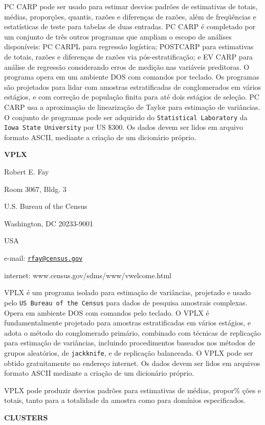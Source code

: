 \documentclass[]{book}
\theoremstyle{definition}
\theoremstyle{definition}
\theoremstyle{definition}
\theoremstyle{remark}
\begin{document}
PC CARP pode ser usado para estimar desvios padrões de estimativas de
totais, médias, proporções, quantis, razões e diferenças de razões, além
de freqüências e estatísticas de teste para tabelas de duas entradas. PC
CARP é completado por um conjunto de três outros programas que ampliam o
escopo de análises disponíveis: PC CARPL para regressão logística;
POSTCARP para estimativas de totais, razões e diferenças de razões via
pós-estratificação; e EV CARP para análise de regressão considerando
erros de medição nas variáveis preditoras. O programa opera em um
ambiente DOS com comandos por teclado. Os programas são projetados para
lidar com amostras estratificadas de conglomerados em vários estágios, e
com correção de população finita para até dois estágios de seleção. PC
CARP usa a aproximação de linearização de Taylor para estimação de
variâncias. O conjunto de programas pode ser adquirido do
\texttt{Statistical\ Laboratory} da \texttt{Iowa\ State\ University} por
US \(\$300\). Os dados devem ser lidos em arquivo formato ASCII,
mediante a criação de um dicionário próprio.

\textbf{VPLX}

Robert E. Fay

Room 3067, Bldg. 3

U.S. Bureau of the Census

Washington, DC 20233-9001

USA

e-mail: \href{mailto:rfay@census.gov}{\nolinkurl{rfay@census.gov}}

internet: www.census.gov/sdms/www/vwelcome.html

VPLX é um programa isolado para estimação de variâncias, projetado e
usado pelo \texttt{US\ Bureau\ of\ the\ Census} para dados de pesquisa
amostrais complexas. Opera em ambiente DOS com comandos pelo teclado. O
VPLX é fundamentalmente projetado para amostras estratificadas em vários
estágios, e adota o método do conglomerado primário, combinado com
técnicas de replicação para estimação de variâncias, incluindo
procedimentos baseados nos métodos de grupos aleatórios, de
\texttt{jackknife}, e de replicação balanceada. O VPLX pode ser obtido
gratuitamente no endereço internet. Os dados devem ser lidos em arquivos
formato ASCII mediante a criação de um dicionário próprio.

VPLX pode produzir desvios padrões para estimativas de médias, propor\%
ções e totais, tanto para a totalidade da amostra como para domínios
especificados.

\textbf{CLUSTERS}
\end{document}
